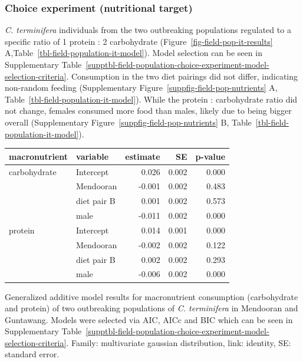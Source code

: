 \documentclass[
]{article}
\begin{document}
\subsubsection{Choice experiment (nutritional
target)}\label{choice-experiment-nutritional-target}

\emph{C. terminifera} individuals from the two outbreaking populations
regulated to a specific ratio of 1 protein : 2 carbohydrate
(Figure~\ref{fig-field-pop-it-results}
A,Table~\ref{tbl-field-population-it-model}). Model selection can be
seen in
Supplementary Table~\ref{supptbl-field-population-choice-experiment-model-selection-criteria}.
Consumption in the two diet pairings did not differ, indicating
non-random feeding
(Supplementary Figure~\ref{suppfig-field-pop-nutrients} A,
Table~\ref{tbl-field-population-it-model}). While the protein :
carbohydrate ratio did not change, females consumed more food than
males, likely due to being bigger overall
(Supplementary Figure~\ref{suppfig-field-pop-nutrients} B,
Table~\ref{tbl-field-population-it-model}).

\begin{tbl}

\begin{minipage}{\linewidth}

\begingroup
\fontsize{12.0pt}{14.4pt}\selectfont
\begin{longtable*}{llrrr}
\toprule
macronutrient & variable & estimate & SE & p-value \\ 
\midrule\addlinespace[2.5pt]
carbohydrate & Intercept & 0.026 & 0.002 & 0.000 \\ 
 & Mendooran & -0.001 & 0.002 & 0.483 \\ 
 & diet pair B & 0.001 & 0.002 & 0.573 \\ 
 & male & -0.011 & 0.002 & 0.000 \\ 
protein & Intercept & 0.014 & 0.001 & 0.000 \\ 
 & Mendooran & -0.002 & 0.002 & 0.122 \\ 
 & diet pair B & 0.002 & 0.002 & 0.293 \\ 
 & male & -0.006 & 0.002 & 0.000 \\ 
\bottomrule
\end{longtable*}
\endgroup

\end{minipage}%

\caption{\label{tbl-field-population-it-model}Generalized additive model
results for macronutrient consumption (carbohydrate and protein) of two
outbreaking populations of \emph{C. terminifera} in Mendooran and
Guntawang. Models were selected via AIC, AICc and BIC which can be seen
in
Supplementary Table~\ref{supptbl-field-population-choice-experiment-model-selection-criteria}.
Family: multivariate gaussian distribution, link: identity, SE: standard
error.}

\end{tbl}%
\end{document}
